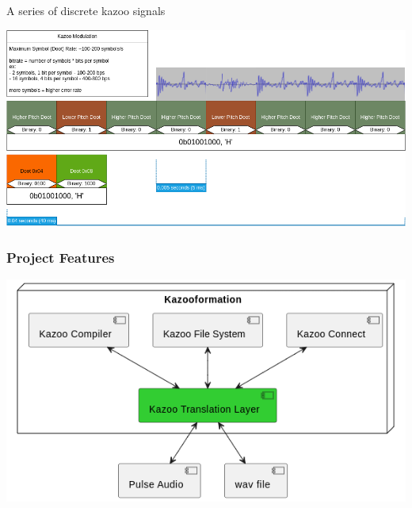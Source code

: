 \documentclass[
	11pt, %
]{beamer}
\begin{document}
\begin{frame}

  A series of discrete kazoo signals

  \begin{center}
    \includegraphics[width=1\linewidth]{kazoo_signals.png}
  \end{center}


\end{frame}


\begin{frame}
  \frametitle{Project Features}

  \begin{center}
    \includegraphics[width=0.6\linewidth]{org_diagram.png}
  \end{center}
\end{frame}

\end{document}
